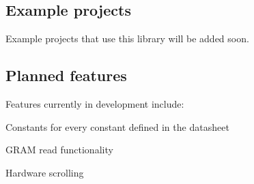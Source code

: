 \subsection*{Example projects }

Example projects that use this library will be added soon.

\subsection*{Planned features }

Features currently in development include\+:


\begin{DoxyItemize}
\item Constants for every constant defined in the datasheet
\item G\+R\+A\+M read functionality
\item Hardware scrolling 
\end{DoxyItemize}